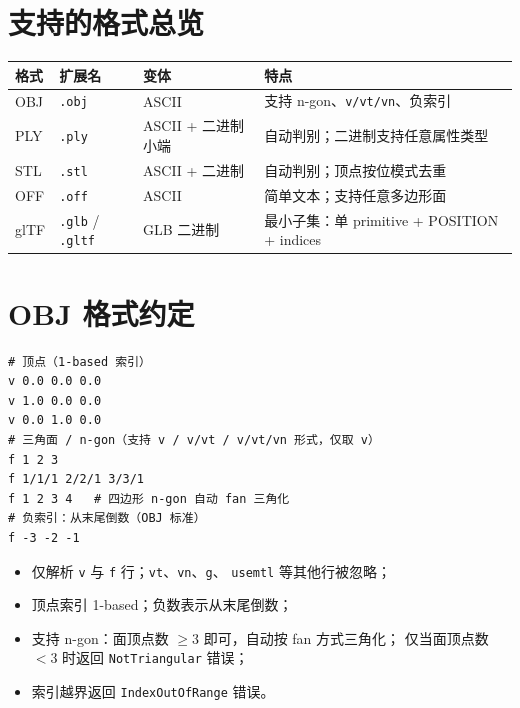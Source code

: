 \documentclass[11pt,a4paper]{article}
\begin{document}
\section{支持的格式总览}

\begin{center}
\renewcommand{\arraystretch}{1.18}
\begin{tabular}{@{}llll@{}}
  \toprule
  \textbf{格式} & \textbf{扩展名} & \textbf{变体} & \textbf{特点} \\
  \midrule
  OBJ  & \texttt{.obj}            & ASCII                 & 支持 n-gon、\texttt{v/vt/vn}、负索引 \\
  PLY  & \texttt{.ply}            & ASCII + 二进制小端    & 自动判别；二进制支持任意属性类型 \\
  STL  & \texttt{.stl}            & ASCII + 二进制        & 自动判别；顶点按位模式去重 \\
  OFF  & \texttt{.off}            & ASCII                 & 简单文本；支持任意多边形面 \\
  glTF & \texttt{.glb} / \texttt{.gltf} & GLB 二进制      & 最小子集：单 primitive + POSITION + indices \\
  \bottomrule
\end{tabular}
\end{center}

\section{OBJ 格式约定}

\begin{lstlisting}
# 顶点（1-based 索引）
v 0.0 0.0 0.0
v 1.0 0.0 0.0
v 0.0 1.0 0.0
# 三角面 / n-gon（支持 v / v/vt / v/vt/vn 形式，仅取 v）
f 1 2 3
f 1/1/1 2/2/1 3/3/1
f 1 2 3 4   # 四边形 n-gon 自动 fan 三角化
# 负索引：从末尾倒数（OBJ 标准）
f -3 -2 -1
\end{lstlisting}

\begin{itemize}
  \item 仅解析 \texttt{v} 与 \texttt{f} 行；\texttt{vt}、\texttt{vn}、\texttt{g}、
        \texttt{usemtl} 等其他行被忽略；
  \item 顶点索引 1-based；负数表示从末尾倒数；
  \item 支持 n-gon：面顶点数 $\ge 3$ 即可，自动按 fan 方式三角化；
        仅当面顶点数 $< 3$ 时返回 \texttt{NotTriangular} 错误；
  \item 索引越界返回 \texttt{IndexOutOfRange} 错误。
\end{itemize}
\end{document}
